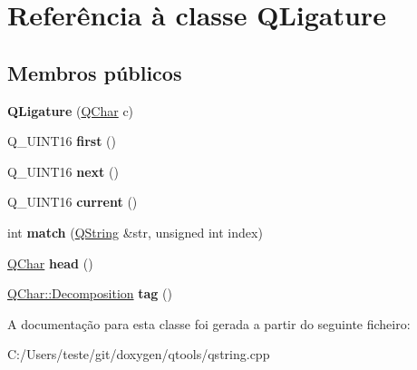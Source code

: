 \hypertarget{class_q_ligature}{\section{Referência à classe Q\-Ligature}
\label{class_q_ligature}
}
\subsection*{Membros públicos}
\begin{DoxyCompactItemize}
\item 
\hypertarget{class_q_ligature_aa6a43cf6dc07a6a85c3984b9aed5512f}{{\bfseries Q\-Ligature} (\hyperlink{class_q_char}{Q\-Char} c)}\label{class_q_ligature_aa6a43cf6dc07a6a85c3984b9aed5512f}

\item 
\hypertarget{class_q_ligature_ab64be6d7ecdee27f28fc33f2a8a5cf51}{Q\-\_\-\-U\-I\-N\-T16 {\bfseries first} ()}\label{class_q_ligature_ab64be6d7ecdee27f28fc33f2a8a5cf51}

\item 
\hypertarget{class_q_ligature_a9be99cf35c78c8b4e12aac2b72c25606}{Q\-\_\-\-U\-I\-N\-T16 {\bfseries next} ()}\label{class_q_ligature_a9be99cf35c78c8b4e12aac2b72c25606}

\item 
\hypertarget{class_q_ligature_a7ffedbf87528754ec3cbedc9f8cb5e97}{Q\-\_\-\-U\-I\-N\-T16 {\bfseries current} ()}\label{class_q_ligature_a7ffedbf87528754ec3cbedc9f8cb5e97}

\item 
\hypertarget{class_q_ligature_a6cc0c8230e544a68fe4d7bc64d999216}{int {\bfseries match} (\hyperlink{class_q_string}{Q\-String} \&str, unsigned int index)}\label{class_q_ligature_a6cc0c8230e544a68fe4d7bc64d999216}

\item 
\hypertarget{class_q_ligature_ac835ec4b8a53f83e503de45a6f9bfd47}{\hyperlink{class_q_char}{Q\-Char} {\bfseries head} ()}\label{class_q_ligature_ac835ec4b8a53f83e503de45a6f9bfd47}

\item 
\hypertarget{class_q_ligature_a35fe7a50ebbfae24f141ebb64c4a0151}{\hyperlink{class_q_char_a9416cff6b11eb874218733dac5b6ea96}{Q\-Char\-::\-Decomposition} {\bfseries tag} ()}\label{class_q_ligature_a35fe7a50ebbfae24f141ebb64c4a0151}

\end{DoxyCompactItemize}


A documentação para esta classe foi gerada a partir do seguinte ficheiro\-:\begin{DoxyCompactItemize}
\item 
C\-:/\-Users/teste/git/doxygen/qtools/qstring.\-cpp\end{DoxyCompactItemize}
